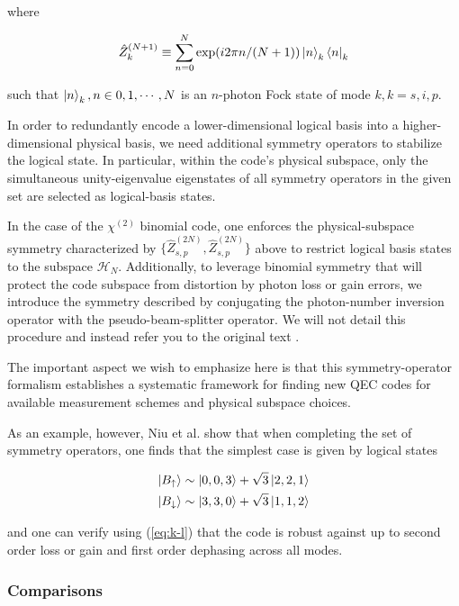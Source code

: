 \documentclass[12]{amsart}
\newcommand\0{\mathbf{0}}
\newcommand\<{\langle}
\renewcommand\>{\rangle}
\begin{document}
where

\begin{align*}
\hat{Z}_{k}^{(N + 1)} \equiv \sum_{n=0}^{N}\exp(i 2 \pi n / (N+1))	\ket{n}_k \bra{n}_k
\end{align*}

such that $\ket{n}_k, n \in 0, 1, \cdots, N$ is an $n$-photon Fock state of mode $k, k = s, i, p$.


In order to redundantly encode a lower-dimensional logical basis into a higher-dimensional physical basis, we need additional symmetry operators to stabilize the logical state. In particular, within the code’s physical subspace, only the simultaneous unity-eigenvalue eigenstates of all symmetry operators in the given set are selected as logical-basis states.

In the case of the $\chi^{(2)}$ binomial code, one enforces the physical-subspace symmetry characterized by $\{ \hat{Z}_{s, p}^{(2N)}, \hat{Z}_{s, p}^{(2N)}\}$ above to restrict logical basis states to the subspace $\mathcal{H}_N$. Additionally, to leverage binomial symmetry that will protect the code subspace from distortion by photon loss or gain errors, we introduce the symmetry described by conjugating the photon-number inversion operator with the pseudo-beam-splitter operator. We will not detail this procedure and instead refer you to the original text \cite{niu2018hardware}.

The important aspect we wish to emphasize here is that this symmetry-operator formalism establishes a systematic framework for finding new QEC codes for available measurement schemes and physical subspace choices.

As an example, however, Niu et al. show that when completing the set of symmetry operators, one finds that the simplest case is given by logical states

\begin{align*}
	\ket{B_{\uparrow}} &\sim \ket{0, 0, 3} + \sqrt{3}\ket{2, 2, 1}\\
	\ket{B_{\downarrow}} &\sim \ket{3, 3, 0} + \sqrt{3}\ket{1, 1, 2}
\end{align*}

and one can verify using (\ref{eq:k-l}) that the code is robust against up to second order loss or gain and first order dephasing across all modes.

\subsubsection{Comparisons}
\end{document}
